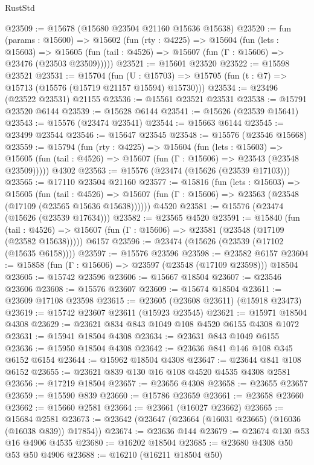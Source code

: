 \begin{lexlean}{RustStd}
\begin{coremodule}
@23509 := @15678 (@15680 @23504 @21160 @15636 @15638)
@23520 := fun (params : @15600) =>
  @15602
    (fun (rty : @4225) =>
    @15604
      (fun (lets : @15603) =>
      @15605 (fun (tail : @4526) => @15607 (fun (Γ : @15606) => @23476 (@23503 @23509)))))
@23521 := @15601 @23520
@23522 := @15598 @23521
@23531 := @15704
    (fun (U : @15703) => @15705 (fun (t : @7) => @15713 (@15576 (@15719 @21157 @15594) @15730)))
@23534 := @23496 (@23522 @23531) @21155
@23536 := @15561 @23521 @23531
@23538 := @15791 @23520 @6144
@23539 := @15628 @6144
@23541 := @15626 (@23539 @15641)
@23543 := @15576 (@23474 @23541)
@23544 := @15663 @6144
@23545 := @23499 @23544
@23546 := @15647 @23545
@23548 := @15576 (@23546 @15668)
@23559 := @15794
    (fun (rty : @4225) =>
    @15604
      (fun (lets : @15603) =>
      @15605 (fun (tail : @4526) => @15607 (fun (Γ : @15606) => @23543 (@23548 @23509)))))
    @4302
@23563 := @15576 (@23474 (@15626 (@23539 @17103)))
@23565 := @17110 @23504 @21160
@23577 := @15816
    (fun (lets : @15603) =>
    @15605
      (fun (tail : @4526) =>
      @15607 (fun (Γ : @15606) => @23563 (@23548 (@17109 (@23565 @15636 @15638))))))
    @4520
@23581 := @15576 (@23474 (@15626 (@23539 @17634)))
@23582 := @23565 @4520
@23591 := @15840
    (fun (tail : @4526) => @15607 (fun (Γ : @15606) => @23581 (@23548 (@17109 (@23582 @15638)))))
    @6157
@23596 := @23474 (@15626 (@23539 (@17102 (@15635 @6158))))
@23597 := @15576 @23596
@23598 := @23582 @6157
@23604 := @15858 (fun (Γ : @15606) => @23597 (@23548 (@17109 @23598))) @18504
@23605 := @15742 @23596
@23606 := @15667 @18504
@23607 := @23546 @23606
@23608 := @15576 @23607
@23609 := @15674 @18504
@23611 := @23609 @17108 @23598
@23615 := @23605 (@23608 @23611) (@15918 @23473)
@23619 := @15742 @23607 @23611 (@15923 @23545)
@23621 := @15971 @18504 @4308
@23629 := @23621 @834 @843 @1049 @108 @4520 @6155 @4308 @1072
@23631 := @15941 @18504 @4308
@23634 := @23631 @843 @1049 @6155
@23636 := @15950 @18504 @4308
@23642 := @23636 @841 @146 @108 @345 @6152 @6154
@23644 := @15962 @18504 @4308
@23647 := @23644 @841 @108 @6152
@23655 := @23621 @839 @130 @16 @108 @4520 @4535 @4308 @2581
@23656 := @17219 @18504
@23657 := @23656 @4308
@23658 := @23655 @23657
@23659 := @15590 @839
@23660 := @15786 @23659
@23661 := @23658 @23660
@23662 := @15660 @2581
@23664 := @23661 (@16027 @23662)
@23665 := @15684 @2581
@23673 := @23642 (@23647 (@23664 (@16031 @23665) (@16036 (@16038 @839)) @17854))
@23674 := @23636 @144
@23679 := @23674 @130 @53 @16 @4906 @4535
@23680 := @16202 @18504
@23685 := @23680 @4308 @50 @53 @50 @4906
@23688 := @16210 (@16211 @18504 @50)

\end{coremodule}
\end{lexlean}
